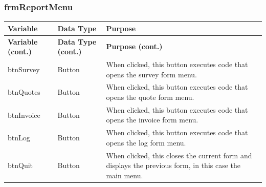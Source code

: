 	\subsubsection{frmReportMenu}
	\begin{longtable}{ | p{4cm} | p{3cm} | p{10cm} |}
		\hline
		\textbf{Variable} & \textbf{Data Type} & \textbf{Purpose}\\
		\endfirsthead
		\hline
		\textbf{Variable (cont.)} & \textbf{Data Type (cont.)} & \textbf{Purpose (cont.)}\\
		\endhead
		\hline
		btnSurvey & Button & When clicked, this button executes code that opens the survey form menu.\\
		\hline
		btnQuotes & Button & When clicked, this button executes code that opens the quote form menu.\\
		\hline
		btnInvoice & Button & When clicked, this button executes code that opens the invoice form menu.\\
		\hline
		btnLog & Button & When clicked, this button executes code that opens the log form menu.\\
		\hline
		btnQuit & Button & When clicked, this closes the current form and displays the previous form, in this case the main menu.\\
		\hline
	\end{longtable}
	
